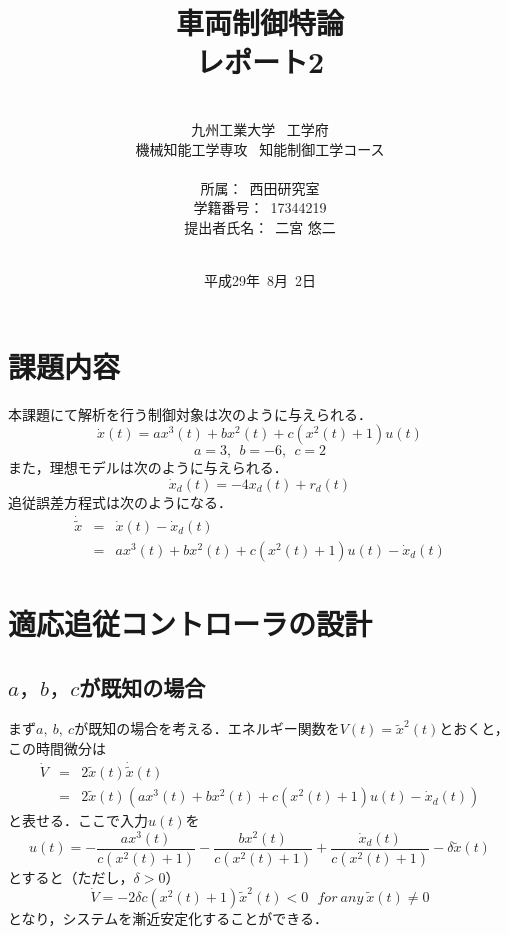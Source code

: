 \documentclass[a4paper,12pt]{jarticle}
\title{\vspace{5mm}
\Large{車両制御特論\\レポート2\\}
}
\author{\vspace{80mm}\\
九州工業大学\ \hspace{0mm} 工学府\\
機械知能工学専攻\ \hspace{0mm} 知能制御工学コース\\
\\
所属：\ 西田研究室\\
学籍番号：\ 17344219\\
提出者氏名：\ 二宮 \hspace{0mm} 悠二\\\vspace{5mm}\\}
\date{平成29年\ 8月\ 2日}
\begin{document}
\titlepage
\maketitle
\thispagestyle{empty}
\newpage
\thispagestyle{empty}
\tableofcontents
\newpage
\section{課題内容}
本課題にて解析を行う制御対象は次のように与えられる．
\begin{equation}
 \dot{x}(t) = ax^3(t) + bx^2(t) + c \left( x^2(t) + 1 \right) u(t)
\end{equation}
\begin{equation}
 a = 3, ~~ b = -6, ~~ c = 2
\end{equation}
また，理想モデルは次のように与えられる．
\begin{equation}
 \dot{x}_d(t) = -4x_d(t) + r_d(t)
 \label{ideal}
\end{equation}
追従誤差方程式は次のようになる．
\begin{eqnarray}
 \dot{\tilde{x}} & = & \dot{x}(t) - \dot{x}_d(t) \nonumber \\
                 & = & ax^3(t) + bx^2(t) + c \left( x^2(t) + 1 \right) u(t) - \dot{x}_d(t)
\end{eqnarray}
\section{適応追従コントローラの設計}
\subsection{$ a，b，c $が既知の場合}
まず$ a, ~ b, ~ c $が既知の場合を考える．エネルギー関数を$ V(t) = \tilde{x}^2(t) $とおくと，この時間微分は
\begin{eqnarray}
 \dot{V} & = & 2 \tilde{x}(t) \dot{\tilde{x}}(t) \nonumber \\
         & = & 2\tilde{x}(t) \left( ax^3(t) + bx^2(t) + c \left( x^2(t) +1 \right) u(t) - \dot{x}_d(t) \right)
\end{eqnarray}
と表せる．ここで入力$ u(t) $を
\begin{equation}
 u(t) = - \dfrac{ax^3(t)}{c\left( x^2(t) + 1 \right)} - \dfrac{bx^2(t)}{c\left( x^2(t) + 1 \right)} +\dfrac{\dot{x}_d(t)}{c\left( x^2(t) + 1 \right)} - \delta \tilde{x}(t)
\end{equation}
とすると（ただし，$ \delta > 0 $）
\begin{equation}
 \dot{V} = -2 \delta c \left( x^2(t) + 1 \right) \tilde{x}^2(t) < 0 ~~~ for ~ any ~ \tilde{x}(t) \neq 0
\end{equation}
となり，システムを漸近安定化することができる．
\end{document}
